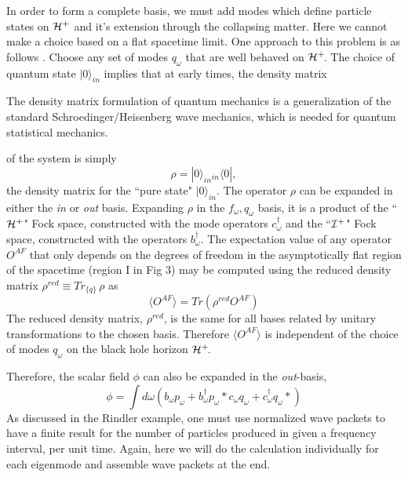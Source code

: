 \documentclass[12pt]{article}
\newcommand{\be}{\begin{equation}}
\newcommand{\ee}{\end{equation}}
\newcommand{\p}{\partial}
\def\fh{{\cal H}^+}
\def\finf{{\cal I}^+}
\def\f{f_{\omega}}
\def\p{p_{\omega}}
\def\q{q_{\omega}}
\def\b{b_{\omega}}
\def\bd{b^{\dagger}_{\omega} }
\def\c{c_{\omega}}
\def\cd{c^{\dagger}_{\omega} }
\def\vac{|0\rangle_{in} }
\begin{document}
In order to form a complete basis, we must add modes which define particle
states on $\fh$
and it's extension through the collapsing matter. Here we cannot
make a choice based on a flat spacetime limit. One
approach to this problem is as follows \cite{hawking}.  Choose any set of modes
$\q$ that are well behaved on $\fh\!$. The choice of quantum state $\vac$
implies that at early times, the density matrix\begin{footnote}{The density
matrix
formulation of quantum mechanics is a generalization of the standard
Schroedinger/Heisenberg wave mechanics, which is needed for quantum
statistical mechanics.}\end{footnote}
of the system is simply
%
\be\label{density}\rho =\vac {}_{in} \langle0| ,\ee
%
the density matrix for the ``pure state" $\vac$. The operator
$\rho$ can be expanded in either the {\it in} or {\it out} basis. Expanding
$\rho$ in the
$\f ,\q $ basis, it is a product of the ``$\fh$" Fock space, constructed with
the mode operators $\cd$ and the ``$\finf$" Fock space, constructed with
the operators
$\bd$.
The expectation value of any operator $O^{AF}$ that only depends
on the degrees of freedom in the asymptotically flat region of the
spacetime (region I in Fig 3) may be computed using the reduced density
matrix $\rho ^{red} \equiv Tr_{\{q\}}\,\rho$ as
%
\be\label{reduced}\langle O^{AF} \rangle= Tr (\rho^{red} O^{AF} ) \ee
%
The reduced density matrix,
$\rho ^{red}$, is the same for all bases related by unitary transformations
to the chosen basis. Therefore $\langle O^{AF} \rangle$ is independent of the choice of modes
$\q$ on the black hole horizon $\fh\!$.

Therefore, the scalar field $\phi$ can also be expanded in the {\it out}-basis,
%
\be\label{basfour}\phi = \int d\omega (  \b \p + \b^{\dagger} \p *
\c \q + \cd \q * )\ee
%
As discussed in the Rindler example,  one must use normalized
wave packets to have a finite result for the number of particles
produced in given a frequency interval, per unit time.  Again, here we will
do the calculation individually for each eigenmode and assemble wave
packets at the end.
\end{document}
